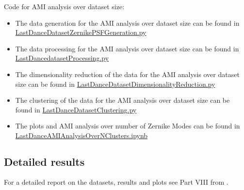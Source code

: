 	Code for AMI analysis over dataset size:
	\begin{itemize}
		\item The data generation for the AMI analysis over dataset size can be found in \href{https://github.com/Dacarpe03/PLImageReconstruction/blob/main/PSFReconstruction/Scripts/LastDanceDatasetZernikePSFGeneration.py}{LastDanceDatasetZernikePSFGeneration.py}
		\item The data processing for the AMI analysis over dataset size can be found in \href{https://github.com/Dacarpe03/PLImageReconstruction/blob/main/PSFReconstruction/Scripts/LastDancedatasetProcessing.py}{LastDancedatasetProcessing.py}
		\item The dimensionality reduction of the data for the AMI analysis over dataset size can be found in \href{https://github.com/Dacarpe03/PLImageReconstruction/blob/main/PSFReconstruction/Scripts/LastDanceDatasetDimensionalityReduction.py}{LastDanceDatasetDimensionalityReduction.py}
		\item The clustering of the data for the AMI analysis over dataset size can be found in \href{https://github.com/Dacarpe03/PLImageReconstruction/blob/main/PSFReconstruction/Scripts/LastDanceDatasetClustering.py}{LastDanceDatasetClustering.py}
		\item The plots and AMI analysis over number of Zernike Modes can be found in \href{https://github.com/Dacarpe03/PLImageReconstruction/blob/main/PSFReconstruction/DataNotebooks/LastDanceAMIAnalysisOverNClusters.ipynb}{LastDanceAMIAnalysisOverNClusters.ipynb}
	\end{itemize}
	
	\subsection{Detailed results}
		For a detailed report on the datasets, results and plots see Part VIII from .